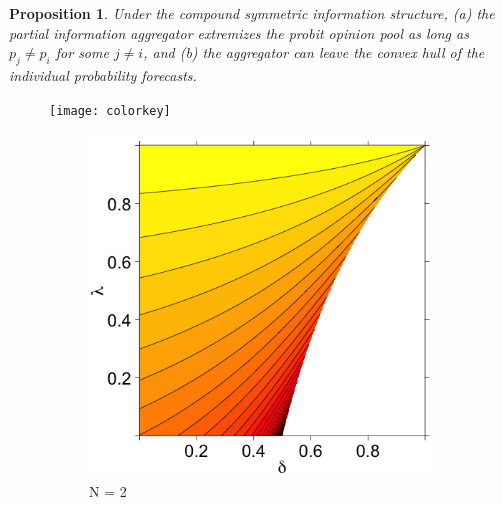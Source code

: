 \documentclass[11pt]{article}
\newtheorem{proposition}[theorem]{Proposition}
\theoremstyle{definition}
\theoremstyle{definition}
\begin{document}
\begin{proposition}
\label{positiveThm}
Under the compound symmetric information structure, (a) the partial information aggregator extremizes the probit opinion pool as long as $p_j \neq p_i$ for some $j \neq i$, and (b) the aggregator can leave the convex hull of the individual probability forecasts. 
\end{proposition}

\begin{figure}[t]
\centering
\hspace*{1.2em} 	\texttt{[image: colorkey]} %
        \centering
        \begin{subfigure}[b]{0.499\textwidth}
                \includegraphics[width=\textwidth]{ExtremeN2}
\caption{N = 2}	
\label{ExtremeN2}
        \end{subfigure}%
        \begin{subfigure}[b]{0.499\textwidth}

\end{subfigure}
\end{figure}
\end{document}
